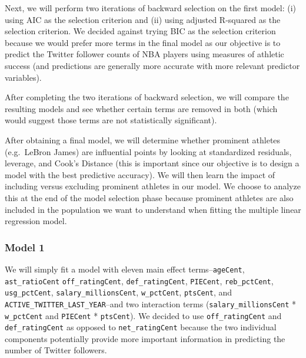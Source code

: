 \documentclass[]{article}
\begin{document}
Next, we will perform two iterations of backward selection on the first
model: (i) using AIC as the selection criterion and (ii) using adjusted
R-squared as the selection criterion. We decided against trying BIC as
the selection criterion because we would prefer more terms in the final
model as our objective is to predict the Twitter follower counts of NBA
players using measures of athletic success (and predictions are
generally more accurate with more relevant predictor variables).

After completing the two iterations of backward selection, we will
compare the resulting models and see whether certain terms are removed
in both (which would suggest those terms are not statistically
significant).

After obtaining a final model, we will determine whether prominent
athletes (e.g.~LeBron James) are influential points by looking at
standardized residuals, leverage, and Cook's Distance (this is important
since our objective is to design a model with the best predictive
accuracy). We will then learn the impact of including versus excluding
prominent athletes in our model. We choose to analyze this at the end of
the model selection phase because prominent athletes are also included
in the population we want to understand when fitting the multiple linear
regression model.

\hypertarget{model-1}{%
\subsubsection{Model 1}\label{model-1}}

We will simply fit a model with eleven main effect
terms--\texttt{ageCent}, \texttt{ast\_ratioCent}
\texttt{off\_ratingCent}, \texttt{def\_ratingCent}, \texttt{PIECent},
\texttt{reb\_pctCent}, \texttt{usg\_pctCent},
\texttt{salary\_millionsCent}, \texttt{w\_pctCent}, \texttt{ptsCent},
and \texttt{ACTIVE\_TWITTER\_LAST\_YEAR}--and two interaction terms
(\texttt{salary\_millionsCent} * \texttt{w\_pctCent} and
\texttt{PIECent} * \texttt{ptsCent}). We decided to use
\texttt{off\_ratingCent} and \texttt{def\_ratingCent} as opposed to
\texttt{net\_ratingCent} because the two individual components
potentially provide more important information in predicting the number
of Twitter followers.
\end{document}
